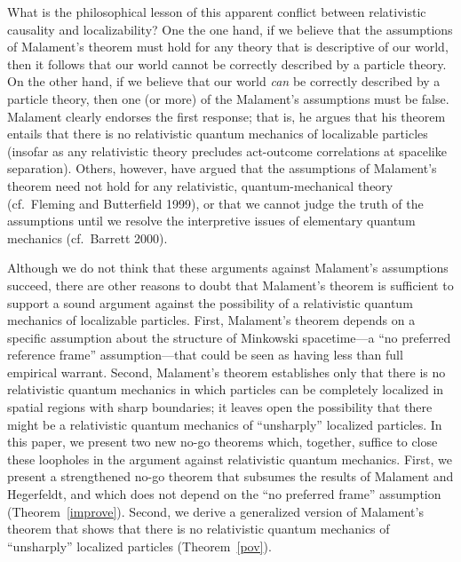 \documentclass[12pt]{article}
\theoremstyle{remark}
\begin{document}
What is the philosophical lesson of this apparent conflict between
relativistic causality and localizability?  One the one hand, if we
believe that the assumptions of Malament's theorem must hold for any
theory that is descriptive of our world, then it follows that our
world cannot be correctly described by a particle theory.  On the
other hand, if we believe that our world \emph{can} be correctly
described by a particle theory, then one (or more) of the Malament's
assumptions must be false.  Malament clearly endorses the first
response; that is, he argues that his theorem entails that there is no
relativistic quantum mechanics of localizable particles (insofar as
any relativistic theory precludes act-outcome correlations at
spacelike separation).  Others, however, have argued that the
assumptions of Malament's theorem need not hold for any relativistic,
quantum-mechanical theory (cf.~Fleming and Butterfield 1999), or that
we cannot judge the truth of the assumptions until we resolve the
interpretive issues of elementary quantum mechanics (cf.~Barrett
2000).

Although we do not think that these arguments against Malament's
assumptions succeed, there are other reasons to doubt that Malament's
theorem is sufficient to support a sound argument against the
possibility of a relativistic quantum mechanics of localizable
particles.  First, Malament's theorem depends on a specific assumption
about the structure of Minkowski spacetime---a ``no preferred
reference frame'' assumption---that could be seen as having less than
full empirical warrant.  Second, Malament's theorem establishes only
that there is no relativistic quantum mechanics in which particles can
be completely localized in spatial regions with sharp boundaries; it
leaves open the possibility that there might be a relativistic quantum
mechanics of ``unsharply'' localized particles.  In this paper, we
present two new no-go theorems which, together, suffice to close these
loopholes in the argument against relativistic quantum mechanics.
First, we present a strengthened no-go theorem that subsumes the
results of Malament and Hegerfeldt, and which does not depend on the
``no preferred frame'' assumption (Theorem~\ref{improve}).  Second, we
derive a generalized version of Malament's theorem that shows that
there is no relativistic quantum mechanics of ``unsharply'' localized
particles (Theorem~\ref{pov}).
\end{document}
